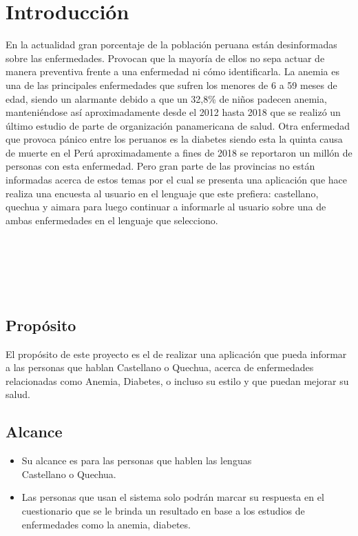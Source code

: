 \chapter{Introducción}
En la actualidad gran porcentaje de la población peruana están desinformadas sobre las enfermedades. Provocan que la mayoría de ellos no sepa actuar de manera preventiva frente a una enfermedad ni cómo identificarla. La anemia es una de las principales enfermedades que sufren los menores de 6 a 59 meses de edad, siendo un alarmante debido a que un 32,8\% de niños padecen anemia, manteniéndose así aproximadamente desde el 2012 hasta 2018 que se realizó un último estudio de parte de organización panamericana de salud. Otra enfermedad que provoca pánico entre los peruanos es la diabetes siendo esta la quinta causa de muerte en el Perú aproximadamente a fines de 2018 se reportaron un millón de personas con esta enfermedad. Pero gran parte de las provincias no están informadas acerca de estos temas por el cual se presenta una aplicación que hace realiza una encuesta al usuario en el lenguaje que este prefiera: castellano, quechua y aimara para luego continuar a informarle al usuario sobre una de ambas enfermedades en el lenguaje que selecciono. 
\\
\\
\\
\\
\\
\\
\section{Propósito}
El propósito de este proyecto es el de realizar una aplicación que pueda informar a las personas que hablan Castellano o Quechua, acerca de enfermedades relacionadas como Anemia, Diabetes, o incluso su estilo y que puedan mejorar su salud.  
\section{Alcance}
\begin{itemize}
	\item Su alcance es para las personas que hablen las lenguas \\Castellano o Quechua.
	\item Las personas que usan el sistema solo podrán marcar su respuesta en el cuestionario que se le brinda un resultado en base a los estudios de enfermedades como la anemia, diabetes.
\end{itemize}

